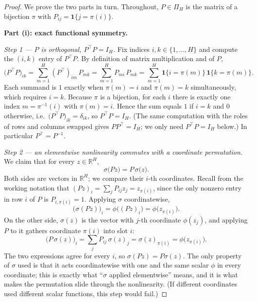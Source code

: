 \documentclass[11pt]{article}
\theoremstyle{definition}
\theoremstyle{remark}
\begin{document}
\begin{proof}
We prove the two parts in turn. Throughout, $P\in\Pi_H$ is the matrix of a bijection $\pi$ with
$P_{ij}=\mathbf 1\{j=\pi(i)\}$.

\medskip
\noindent\textbf{Part (i): exact functional symmetry.}

\emph{Step 1 --- $P$ is orthogonal, $P^{\top}P=I_H$.}
Fix indices $i,k\in\{1,\dots,H\}$ and compute the $(i,k)$ entry of $P^{\top}P$. By definition of
matrix multiplication and of $P$,
\[
\bigl(P^{\top}P\bigr)_{ik}
=\sum_{m=1}^{H} (P^{\top})_{im}\,P_{mk}
=\sum_{m=1}^{H} P_{mi}\,P_{mk}
=\sum_{m=1}^{H} \mathbf 1\{i=\pi(m)\}\,\mathbf 1\{k=\pi(m)\}.
\]
Each summand is $1$ exactly when $\pi(m)=i$ and $\pi(m)=k$ simultaneously, which requires $i=k$.
Because $\pi$ is a bijection, for each $i$ there is exactly one index $m=\pi^{-1}(i)$ with
$\pi(m)=i$. Hence the sum equals $1$ if $i=k$ and $0$ otherwise, i.e.\
$\bigl(P^{\top}P\bigr)_{ik}=\delta_{ik}$, so $P^{\top}P=I_H$. (The same computation with the roles of
rows and columns swapped gives $PP^{\top}=I_H$; we only need $P^{\top}P=I_H$ below.) In particular
$P^{\top}=P^{-1}$.

\emph{Step 2 --- an elementwise nonlinearity commutes with a coordinate permutation.}
We claim that for every $z\in\mathbb{R}^H$,
\[
\sigma\bigl(P z\bigr)=P\,\sigma\bigl(z\bigr).
\]
Both sides are vectors in $\mathbb{R}^H$; we compare their $i$-th coordinates. Recall from the
working notation that $(Pz)_i=\sum_j P_{ij}z_j = z_{\pi(i)}$, since the only nonzero entry in row $i$
of $P$ is $P_{i,\pi(i)}=1$. Applying $\sigma$ coordinatewise,
\[
\bigl(\sigma(Pz)\bigr)_i=\phi\bigl((Pz)_i\bigr)=\phi\bigl(z_{\pi(i)}\bigr).
\]
On the other side, $\sigma(z)$ is the vector with $j$-th coordinate $\phi(z_j)$, and applying $P$ to
it gathers coordinate $\pi(i)$ into slot $i$:
\[
\bigl(P\,\sigma(z)\bigr)_i=\sum_{j}P_{ij}\,\sigma(z)_j=\sigma(z)_{\pi(i)}=\phi\bigl(z_{\pi(i)}\bigr).
\]
The two expressions agree for every $i$, so $\sigma(Pz)=P\sigma(z)$. The only property of $\sigma$
used is that it acts coordinatewise with one and the same scalar $\phi$ in every coordinate; this is
exactly what ``$\sigma$ applied elementwise'' means, and it is what makes the permutation slide
through the nonlinearity. (If different coordinates used different scalar functions, this step would
fail.)


\end{proof}
\end{document}
